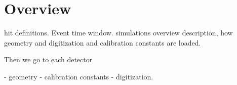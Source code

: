 \section{Overview}

hit definitions. Event time window.
simulations overview description, how geometry and digitization and calibration constants are loaded.

Then we go to each detector

- geometry
- calibration constants
- digitization.




